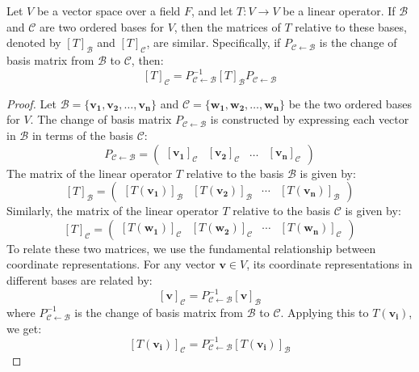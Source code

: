\documentclass[openany]{book}
\begin{document}
\begin{mytheorem}
    Let $V$ be a vector space over a field $F$, and let $T: V \to V$ be a linear operator. If $\mathcal{B}$ and $\mathcal{C}$ are two ordered bases for $V$, then the matrices of $T$ relative to these bases, denoted by $[T]_{\mathcal{B}}$ and $[T]_{\mathcal{C}}$, are similar. Specifically, if $P_{\mathcal{C} \leftarrow \mathcal{B}}$ is the change of basis matrix from $\mathcal{B}$ to $\mathcal{C}$, then:
    \[[T]_{\mathcal{C}} = P_{\mathcal{C} \leftarrow \mathcal{B}}^{-1} [T]_{\mathcal{B}} P_{\mathcal{C} \leftarrow \mathcal{B}}\]
\end{mytheorem}
\begin{proof}
    Let $\mathcal{B} = \{\mathbf{v_1}, \mathbf{v_2}, \ldots, \mathbf{v_n}\}$ and $\mathcal{C} = \{\mathbf{w_1}, \mathbf{w_2}, \ldots, \mathbf{w_n}\}$ be the two ordered bases for $V$. The change of basis matrix $P_{\mathcal{C} \leftarrow \mathcal{B}}$ is constructed by expressing each vector in $\mathcal{B}$ in terms of the basis $\mathcal{C}$:
    \[P_{\mathcal{C} \leftarrow \mathcal{B}} = \begin{pmatrix}[\mathbf{v_1}]_{\mathcal{C}} & [\mathbf{v_2}]_{\mathcal{C}} & \ldots & [\mathbf{v_n}]_{\mathcal{C}}\end{pmatrix}\]
    The matrix of the linear operator $T$ relative to the basis $\mathcal{B}$ is given by:
    \[[T]_{\mathcal{B}} = \begin{pmatrix}[T(\mathbf{v_1})]_{\mathcal{B}} & [T(\mathbf{v_2})]_{\mathcal{B}} & \cdots & [T(\mathbf{v_n})]_{\mathcal{B}}\end{pmatrix}\]
    Similarly, the matrix of the linear operator $T$ relative to the basis $\mathcal{C}$ is given by:
    \[[T]_{\mathcal{C}} = \begin{pmatrix}[T(\mathbf{w_1})]_{\mathcal{C}} & [T(\mathbf{w_2})]_{\mathcal{C}} & \cdots & [T(\mathbf{w_n})]_{\mathcal{C}}\end{pmatrix}\]
    To relate these two matrices, we use the fundamental relationship between coordinate representations. For any vector $\mathbf{v} \in V$, its coordinate representations in different bases are related by:
    \[[\mathbf{v}]_{\mathcal{C}} = P_{\mathcal{C} \leftarrow \mathcal{B}}^{-1} [\mathbf{v}]_{\mathcal{B}}\]
    where $P_{\mathcal{C} \leftarrow \mathcal{B}}^{-1}$ is the change of basis matrix from $\mathcal{B}$ to $\mathcal{C}$.
    Applying this to $T(\mathbf{v_i})$, we get:
    \[[T(\mathbf{v_i})]_{\mathcal{C}} = P_{\mathcal{C} \leftarrow \mathcal{B}}^{-1} [T(\mathbf{v_i})]_{\mathcal{B}}\]

\end{proof}
\end{document}
